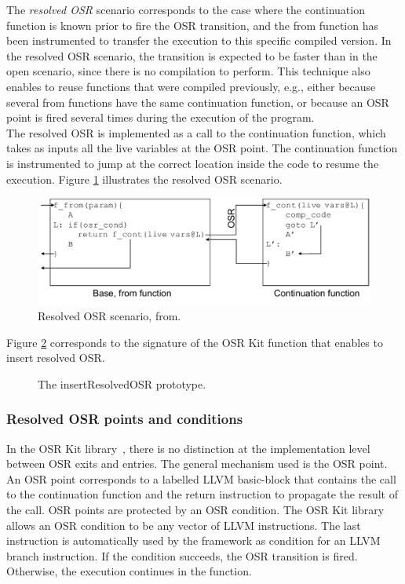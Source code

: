 The \textit{resolved OSR} scenario corresponds to the case where the continuation function is known prior to fire the OSR transition, and the from function has been instrumented to transfer the execution to this specific compiled version.
In the resolved OSR scenario, the transition is expected to be faster than in the open scenario, since there is no compilation to perform. 
This technique also enables to reuse functions that were compiled previously, e.g., either because several from functions have the same continuation function, or because an OSR point is fired several times during the execution of the program.\\

The resolved OSR is implemented as a call to the continuation function, which takes as inputs all the live variables at the OSR point.
The continuation function is instrumented to jump at the correct location inside the code to resume the execution. 
Figure \ref{ResolvedOSRFig} illustrates the resolved OSR scenario.\\

\begin{figure}[h]
\centering
\includegraphics[scale=0.5]{Figures/OSRKitResolvedScenario}
\decoRule
\caption[Resolved OSR Scenario]{Resolved OSR scenario, from\cite{OSRKit}.}
\label{ResolvedOSRFig}
\end{figure}

Figure \ref{fig:insertresolvedosr} corresponds to the signature of the OSR Kit function that enables to insert resolved OSR.\\

\begin{figure}[h]
\caption{The insertResolvedOSR prototype.}
\label{fig:insertresolvedosr}
\end{figure}

\subsubsection{Resolved OSR points and conditions}
In the OSR Kit library~\cite{OSRKit}, there is no distinction at the implementation level between OSR exits and entries.
The general mechanism used is the OSR point.
An OSR point corresponds to a labelled LLVM basic-block that contains the call to the continuation function and the return instruction to propagate the result of the call.
OSR points are protected by an OSR condition. 
The OSR Kit library allows an OSR condition to be any vector of LLVM instructions. 
The last instruction is automatically used by the framework as condition for an LLVM branch instruction. 
If the condition succeeds, the OSR transition is fired.
Otherwise, the execution continues in the function.\\

